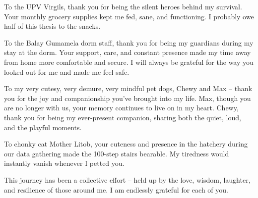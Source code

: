 To the UPV Virgils, thank you for being the silent heroes behind my survival. Your monthly grocery supplies kept me fed, sane, and functioning. I probably owe half of this thesis to the snacks.

To the Balay Gumamela dorm staff, thank you for being my guardians during my stay at the dorm. Your support, care, and constant presence made my time away from home more comfortable and secure. I will always be grateful for the way you looked out for me and made me feel safe.

To my very cutesy, very demure, very mindful pet dogs, Chewy and Max – thank you for the joy and companionship you’ve brought into my life. Max, though you are no longer with us, your memory continues to live on in my heart. Chewy, thank you for being my ever-present companion, sharing both the quiet, loud, and the playful moments.

To chonky cat Mother Litob, your cuteness and presence in the hatchery during our data gathering made the 100-step stairs bearable. My tiredness would instantly vanish whenever I petted you.

This journey has been a collective effort – held up by the love, wisdom, laughter, and resilience of those around me. I am endlessly grateful for each of you.



